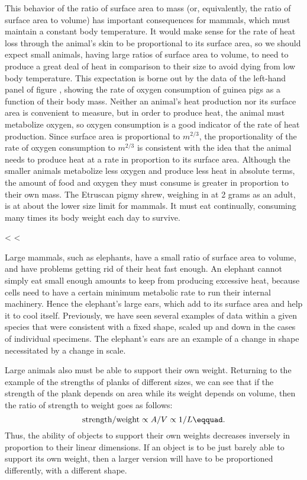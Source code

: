 This behavior of the ratio of surface area to mass (or,
equivalently, the ratio of surface area to volume) has
important consequences for mammals, which must maintain a
constant body temperature. It would make sense for the rate
of heat loss through the animal's skin to be proportional to
its surface area, so we should expect small animals, having
large ratios of surface area to volume, to need to produce a
great deal of heat in comparison to their size to avoid
dying from low body temperature. This expectation is borne
out by the data of the left-hand panel of
figure , showing the rate of
oxygen consumption of guinea pigs as a function of their
body mass. Neither an animal's heat production nor its
surface area is convenient to measure, but in order to
produce heat, the animal must metabolize oxygen, so oxygen
consumption is a good indicator of the rate of heat
production. Since surface area is proportional to $m^{2/3}$, the
proportionality of the rate of oxygen consumption to $m^{2/3}$ is
consistent with the idea that the animal needs to produce
heat at a rate in proportion to its surface area. Although
the smaller animals metabolize less oxygen and produce less
heat in absolute terms, the amount of food and oxygen they
must consume is greater in proportion to their own mass. The
Etruscan pigmy shrew, weighing in at 2 grams as an adult, is
at about the lower size limit for mammals. It must eat
continually, consuming many times its body weight each day to survive.

<%
<%

Large mammals, such as elephants, have a
small ratio of surface area to volume, and have problems
getting rid of their heat fast enough. An elephant cannot
simply eat small enough amounts to keep from producing
excessive heat, because cells need to have a certain minimum
metabolic rate to run their internal machinery. Hence the
elephant's large ears, which add to its surface area and
help it to cool itself. Previously, we have seen several
examples of data within a given species that were consistent
with a fixed shape, scaled up and down in the cases of
individual specimens. The elephant's ears are an example of
a change in shape necessitated by a change in scale.

Large animals also must be able to support their own weight.
Returning to the example of the strengths of planks of
different sizes, we can see that if the strength of the
plank depends on area while its weight depends on volume,
then the ratio of strength to weight goes as follows:
\begin{equation*}
    \text{strength}/\text{weight} \propto A/V \propto 1/L\eqquad.
\end{equation*}
Thus, the ability of objects to support their own weights
decreases inversely in proportion to their linear dimensions.
If an object is to be just barely able to support its own
weight, then a larger version will have to be proportioned
differently, with a different shape.

